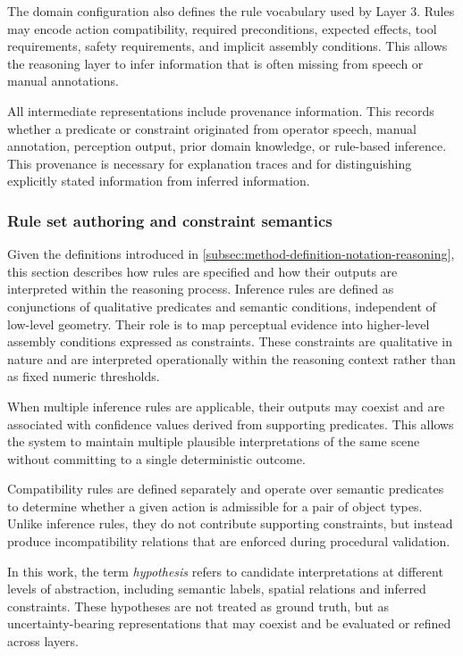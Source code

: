 The domain configuration also defines the rule vocabulary used by Layer 3. Rules may encode action compatibility, required preconditions, expected effects, tool requirements, safety requirements, and implicit assembly conditions. This allows the reasoning layer to infer information that is often missing from speech or manual annotations.

All intermediate representations include provenance information. This records whether a predicate or constraint originated from operator speech, manual annotation, perception output, prior domain knowledge, or rule-based inference. This provenance is necessary for explanation traces and for distinguishing explicitly stated information from inferred information.


\subsubsection{Rule set authoring and constraint semantics}
\label{sec:rule-authoring}

Given the definitions introduced in \cref{subsec:method-definition-notation-reasoning}, this section describes how rules are specified and how their outputs are interpreted within the reasoning process.
Inference rules are defined as conjunctions of qualitative predicates and semantic conditions, independent of low-level geometry. Their role is to map perceptual evidence into higher-level assembly conditions expressed as constraints. These constraints are qualitative in nature and are interpreted operationally within the reasoning context rather than as fixed numeric thresholds.

When multiple inference rules are applicable, their outputs may coexist and are associated with confidence values derived from supporting predicates. This allows the system to maintain multiple plausible interpretations of the same scene without committing to a single deterministic outcome.

Compatibility rules are defined separately and operate over semantic predicates to determine whether a given action is admissible for a pair of object types. Unlike inference rules, they do not contribute supporting constraints, but instead produce incompatibility relations that are enforced during procedural validation.

In this work, the term \textit{hypothesis} refers to candidate interpretations at different levels of abstraction, including semantic labels, spatial relations and inferred constraints. These hypotheses are not treated as ground truth, but as uncertainty-bearing representations that may coexist and be evaluated or refined across layers.


